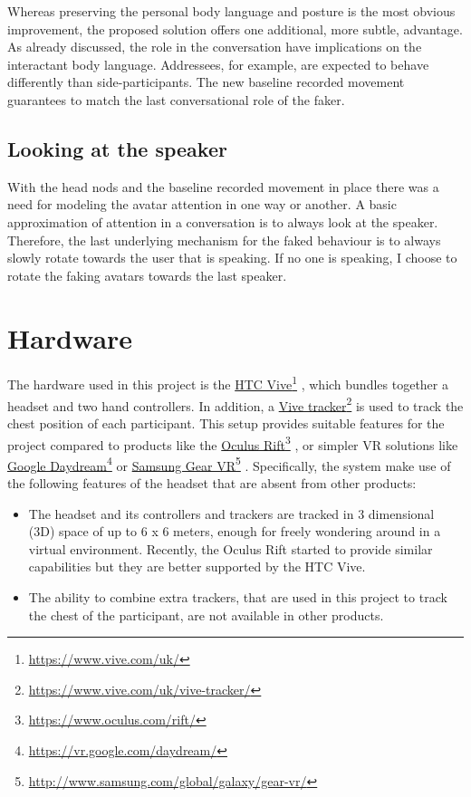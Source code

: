 \documentclass[]{simple-thesis}
\newcommand\fnurl[2]{%
  \href{#2}{#1}\footnote{\url{#2}}%
}
\begin{document}
Whereas preserving the personal body language and posture is the most obvious improvement, the proposed solution offers one additional, more subtle, advantage.
As already discussed, the role in the conversation have implications on the interactant body language.
Addressees, for example, are expected to behave differently than side-participants.
The new baseline recorded movement guarantees to match the last conversational role of the faker.

\subsection{Looking at the speaker}

With the head nods and the baseline recorded movement in place there was a need for modeling the avatar attention in one way or another.
A basic approximation of attention in a conversation is to always look at the speaker.
Therefore, the last underlying mechanism for the faked behaviour is to always slowly rotate towards the user that is speaking.
If no one is speaking, I choose to rotate the faking avatars towards the last speaker.

\section{Hardware}

The hardware used in this project is the \fnurl{HTC Vive}{https://www.vive.com/uk/}, which bundles together a headset and two hand controllers.
In addition, a \fnurl{Vive tracker}{https://www.vive.com/uk/vive-tracker/} is used to track the chest position of each participant.
This setup provides suitable features for the project compared to products like the \fnurl{Oculus Rift}{https://www.oculus.com/rift/}, or simpler VR solutions like \fnurl{Google Daydream}{https://vr.google.com/daydream/} or \fnurl{Samsung Gear VR}{http://www.samsung.com/global/galaxy/gear-vr/}.
Specifically, the system make use of the following features of the headset that are absent from other products:

\begin{itemize}
  \item The headset and its controllers and trackers are tracked in 3 dimensional (3D) space of up to 6 x 6 meters, enough for freely wondering around in a virtual environment. Recently, the Oculus Rift started to provide similar capabilities but they are better supported by the HTC Vive.
  \item The ability to combine extra trackers, that are used in this project to track the chest of the participant, are not available in other products.
\end{itemize}
\end{document}
